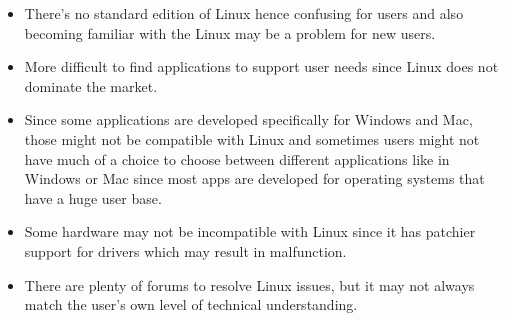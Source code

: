 \documentclass[11pt,a4paper,twoside]{article}
\begin{document}
\begin{itemize}
\item There’s no standard edition of Linux hence confusing for users and also becoming familiar with the Linux may be a problem for new users.
\item More difficult to find applications to support user needs since Linux does not dominate the market.
\item Since some applications are developed specifically for Windows and Mac, those might not be compatible with Linux and sometimes users might not have much of a choice to choose between different applications like in Windows or Mac since most apps are developed for operating systems that have a huge user base.
\item Some hardware may not be incompatible with Linux since it has patchier support for drivers which may result in malfunction.
\item There are plenty of forums to resolve Linux issues, but it may not always match the user’s own level of technical understanding.
\end{itemize}
\end{document}
